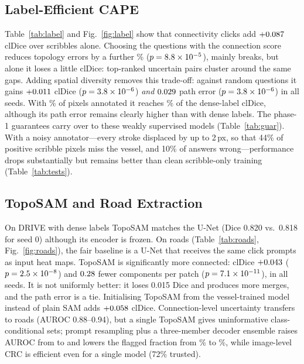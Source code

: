 \documentclass[10pt,letterpaper,journal]{IEEEtran}
\newcommand{\1}{\mathbf{1}}
\begin{document}
\subsection{Label-Efficient CAPE}
Table~\ref{tab:label} and Fig.~\ref{fig:label} show that connectivity clicks add $+0.087$ clDice over scribbles alone. Choosing the questions with the connection score reduces topology errors by a further \NUncPairGain\% ($p=8.8\times10^{-5}$), mainly breaks, but alone it loses a little clDice: top-ranked uncertain pairs cluster around the same gaps. Adding spatial diversity removes this trade-off: against random questions it gains $+0.011$ clDice ($p=3.8\times10^{-6}$) \emph{and} $0.029$ path error ($p=3.8\times10^{-6}$) in all seeds. With \NAnnFrac\% of pixels annotated it reaches \NSparseRatio\% of the dense-label clDice, although its path error remains clearly higher than with dense labels. The phase-1 guarantees carry over to these weakly supervised models (Table~\ref{tab:guar}). With a noisy annotator---every stroke displaced by up to 2\,px, so that 44\% of positive scribble pixels miss the vessel, and 10\% of answers wrong---performance drops substantially but remains better than clean scribble-only training (Table~\ref{tab:tests}).




\subsection{TopoSAM and Road Extraction}
On DRIVE with dense labels TopoSAM matches the U-Net (Dice 0.820 vs.\ 0.818 for seed 0) although its encoder is frozen. On roads (Table~\ref{tab:roads}, Fig.~\ref{fig:roads}), the fair baseline is a U-Net that receives the same click prompts as input heat maps. TopoSAM is significantly more connected: clDice $+0.043$ ($p=2.5\times10^{-8}$) and $0.28$ fewer components per patch ($p=7.1\times10^{-11}$), in all seeds. It is not uniformly better: it loses 0.015 Dice and produces more merges, and the path error is a tie. Initialising TopoSAM from the vessel-trained model instead of plain SAM adds $+0.058$ clDice. Connection-level uncertainty transfers to roads (AUROC 0.88--0.94), but a single TopoSAM gives uninformative class-conditional sets; prompt resampling plus a three-member decoder ensemble raises AUROC from \NSingleAuroc{} to \NEnsAuroc{} and lowers the flagged fraction from \NSingleFlag\% to \NEnsFlag\%, while image-level CRC is efficient even for a single model (72\% trusted).
\end{document}
